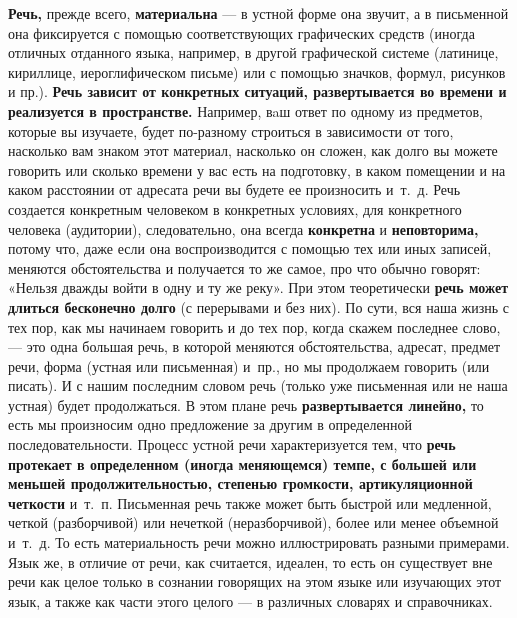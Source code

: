 \textbf{Речь,} прежде всего, \textbf{материальна} --- в устной форме она звучит, а в письменной она фиксируется с помощью соответствующих графических средств (иногда отличных отданного языка, например, в другой графической системе (латинице, кириллице, иероглифическом письме) или с помощью значков, формул, рисунков и пр.).
\textbf{Речь зависит от конкретных ситуаций, развертывается во времени и реализуется в пространстве.}
Например, вaш ответ по одному из предметов, которые вы изучаете, будет по-разному строиться в зависимости от того, насколько вам знаком этот материал, насколько он сложен, как долго вы можете говорить или сколько времени у вас есть на подготовку, в каком помещении и на каком расстоянии от адресата речи вы будете ее произносить и~т.~д.
Речь создается конкретным человеком в конкретных условиях, для конкретного человека (аудитории), следовательно, она всегда \textbf{конкретна} и \textbf{неповторима,} потому что, даже если она воспроизводится с помощью тех или иных записей, меняются обстоятельства и получается то же самое, про что обычно говорят: «Нельзя дважды войти в одну и ту же реку».
При этом теоретически \textbf{речь может длиться бесконечно долго} (с перерывами и без них).
По сути, вся наша жизнь с тех пор, как мы начинаем говорить и до тех пор, когда скажем последнее слово, --- это одна большая речь, в которой меняются обстоятельства, адресат, предмет речи, форма (устная или письменная) и~пр., но мы продолжаем говорить (или писать).
И с нашим последним словом речь (только уже письменная или не наша устная) будет продолжаться.
В этом плане речь \textbf{развертывается линейно,} то есть мы произносим одно предложение за другим в определенной последовательности.
Процесс устной речи характеризуется тем, что \textbf{речь протекает в определенном (иногда меняющемся) темпе, с большей или меньшей продолжительностью, степенью громкости, артикуляционной четкости} и~т.~п.
Письменная речь также может быть быстрой или медленной, четкой (разборчивой) или нечеткой (неразборчивой), более или менее объемной и~т.~д.
То есть материальность речи можно иллюстрировать разными примерами.
Язык же, в отличие от речи, как считается, идеален, то есть он существует вне речи как целое только в сознании говорящих на этом языке или изучающих этот язык, а также как части этого целого --- в различных словарях и справочниках.

